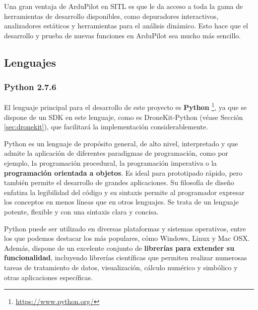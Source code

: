 Una gran ventaja de ArduPilot en SITL es que le da acceso a toda la gama de herramientas de desarrollo disponibles, como depuradores interactivos, analizadores estáticos y herramientas para el análisis dinámico. Esto hace que el desarrollo y prueba de nuevas funciones en ArduPilot sea mucho más sencillo.

\subsection{Lenguajes}
\label{sec:lenguajes}

\subsubsection{Python 2.7.6}
\label{sec:python}

El lenguaje principal para el desarrollo de este proyecto es \textbf{Python} \footnote{\url{https://www.python.org/}}, ya que se dispone de un \acs{SDK} en este lenguaje, como es DroneKit-Python (véase Sección \ref{sec:dronekit}), que facilitará la implementación considerablemente.

Python es un lenguaje de propósito general, de alto nivel, interpretado y que admite la aplicación de diferentes paradigmas de programación, como por ejemplo, la programación procedural, la programación imperativa o la \textbf{programación orientada a objetos}. Es ideal para prototipado rápido, pero también permite el desarrollo de grandes aplicaciones. Su filosofía de diseño enfatiza la legibilidad del código y su sintaxis permite al programador expresar los conceptos en menos líneas que en otros lenguajes. Se trata de un lenguaje potente, flexible y con una sintaxis clara y concisa.

Python puede ser utilizado en diversas plataformas y sistemas operativos, entre los que podemos destacar los más populares, cómo Windows, Linux y Mac OSX. Además, dispone de un excelente conjunto de \textbf{librerías para extender su funcionalidad}, incluyendo librerías científicas que permiten realizar numerosas tareas de tratamiento de datos, visualización, cálculo numérico y simbólico y otras aplicaciones específicas.

